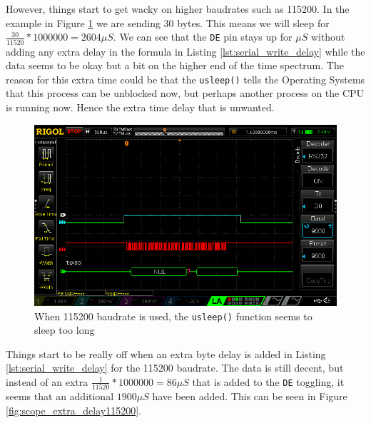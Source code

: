 However, things start to get wacky on higher baudrates such as 115200.
In the example in Figure \ref{fig:scope_no_delay115200} we are sending 30 bytes.
This means we will sleep for $\frac{30}{11520} * 1000000 = 2604  \mu S$.
We can see that the \texttt{DE} pin stays up for  $\mu S$ without adding any extra delay in the formula in Listing \ref{lst:serial_write_delay} while the data seems to be okay but a bit on the higher end of the time spectrum.
The reason for this extra time could be that the \texttt{usleep()} tells the Operating Systems that this process can be unblocked now, but perhaps another process on the CPU is running now. Hence the extra time delay that is unwanted.


\begin{figure}[H]
    \includegraphics[scale=0.4]{figures/Scope_No_Delay115200.png}
    \caption{When 115200 baudrate is used, the \texttt{usleep()} function seems to sleep too long}
    \label{fig:scope_no_delay115200}
\end{figure}


\newpage

Things start to be really off when an extra byte delay is added in Listing \ref{lst:serial_write_delay} for the 115200 baudrate.
The data is still decent, but instead of an extra $\frac{1}{11520} * 1000000 = 86 \mu S$ that is added to the \texttt{DE} toggling, it seems that an additional $1900 \mu S$ have been added.
This can be seen in Figure \ref{fig:scope_extra_delay115200}.

